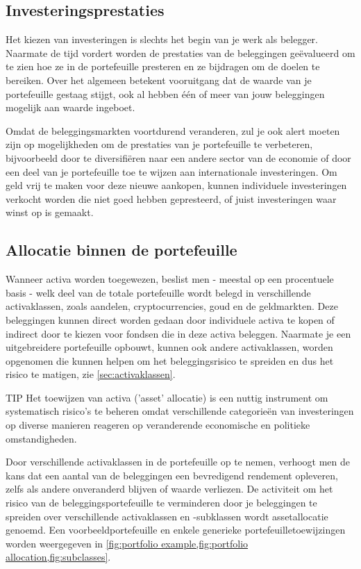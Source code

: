 \subsection{Investeringsprestaties}
Het kiezen van investeringen is slechts het begin van je werk als belegger. Naarmate de tijd vordert worden de prestaties van de beleggingen ge\"evalueerd om te zien hoe ze in de portefeuille presteren en ze bijdragen om de doelen te bereiken. Over het algemeen betekent vooruitgang dat de waarde van je portefeuille gestaag stijgt, ook al hebben \'e\'en of meer van jouw beleggingen mogelijk aan waarde ingeboet.

Omdat de beleggingsmarkten voortdurend veranderen, zul je ook alert moeten zijn op mogelijkheden om de prestaties van je portefeuille te verbeteren, bijvoorbeeld door te diversifi\"eren naar een andere sector van de economie of door een deel van je portefeuille toe te wijzen aan internationale investeringen. Om geld vrij te maken voor deze nieuwe aankopen, kunnen individuele investeringen verkocht worden die niet goed hebben gepresteerd, of juist investeringen waar winst op is gemaakt.

\subsection{Allocatie binnen de portefeuille}
Wanneer activa worden toegewezen, beslist men - meestal op een procentuele basis - welk deel van de totale portefeuille wordt belegd in verschillende activaklassen, zoals aandelen, cryptocurrencies, goud en de geldmarkten. Deze beleggingen kunnen direct worden gedaan door individuele activa te kopen of indirect door te kiezen voor fondsen die in deze activa beleggen. Naarmate je een uitgebreidere portefeuille opbouwt, kunnen ook andere activaklassen, worden opgenomen die kunnen helpen om het beleggingsrisico te spreiden en dus het risico te matigen, zie \cref{sec:activaklassen}.

    \bigskip
    \begin{tipbox}{TIP}
    Het toewijzen van activa ('asset' allocatie) is een nuttig instrument om systematisch risico's te beheren omdat verschillende categorie\"en van investeringen op diverse manieren reageren op veranderende economische en politieke omstandigheden. 
    \end{tipbox}
    \bigskip


Door verschillende activaklassen in de portefeuille op te nemen, verhoogt men de kans dat een aantal van de beleggingen een bevredigend rendement opleveren, zelfs als andere onveranderd blijven of waarde verliezen. De activiteit om het risico van de beleggingsportefeuille te verminderen door je beleggingen te spreiden over verschillende activaklassen en -subklassen wordt assetallocatie genoemd. Een voorbeeldportefeuille en enkele generieke portefeuilletoewijzingen worden weergegeven in \cref{fig:portfolio example,fig:portfolio allocation,fig:subclasses}.

